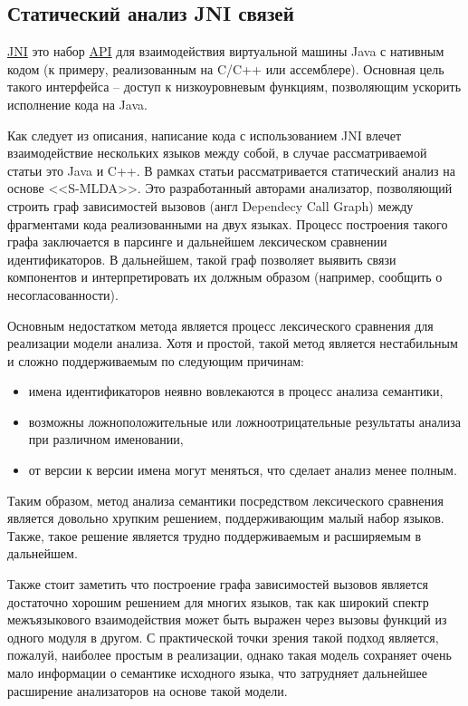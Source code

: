 \subsection{Статический анализ JNI связей} \label{ssec:jni}

\hyperlink{JNI}{JNI} \cite{JNI} это набор \hyperlink{API}{API} для взаимодействия виртуальной машины Java
с нативным кодом (к примеру, реализованным на C/C++ или ассемблере). Основная цель такого интерфейса --
доступ к низкоуровневым функциям, позволяющим ускорить исполнение кода на Java.

Как следует из описания, написание кода с использованием JNI влечет взаимодействие нескольких языков между
собой, в случае рассматриваемой статьи это Java и C++. В рамках статьи рассматривается статический анализ
на основе <<S-MLDA>>. Это разработанный авторами анализатор, позволяющий строить граф зависимостей вызовов (англ
Dependecy Call Graph) между фрагментами кода реализованными на двух языках. Процесс построения такого
графа заключается в парсинге и дальнейшем лексическом сравнении идентификаторов. В дальнейшем, такой
граф позволяет выявить связи компонентов и интерпретировать их должным образом (например, сообщить о 
несогласованности).

Основным недостатком метода является процесс лексического сравнения для реализации модели анализа.
Хотя и простой, такой метод является нестабильным и сложно поддерживаемым по следующим причинам:
\begin{itemize}
    \item имена идентификаторов неявно вовлекаются в процесс анализа семантики,
    \item возможны ложноположительные или ложноотрицательные результаты анализа при различном именовании,
    \item от версии к версии имена могут меняться, что сделает анализ менее полным.
\end{itemize}

Таким образом, метод анализа семантики посредством лексического сравнения является
довольно хрупким решением, поддерживающим малый набор языков. Также, такое решение является трудно поддерживаемым
и расширяемым в дальнейшем. 

Также стоит заметить что построение графа зависимостей вызовов является достаточно хорошим решением для многих
языков, так как широкий спектр межъязыкового взаимодействия может быть выражен через вызовы функций из одного
модуля в другом. С практической точки зрения такой подход является, пожалуй, наиболее простым в реализации, однако
такая модель сохраняет очень мало информации о семантике исходного языка, что затрудняет дальнейшее расширение
анализаторов на основе такой модели.

